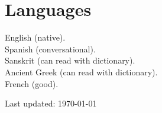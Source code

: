 \documentclass[11pt, letterpaper]{article} %
\newcommand{\years}[1]{\marginnote{\scriptsize #1}} %
\begin{document}


\section*{Languages}
\years{}English (native).\\
\years{}Spanish (conversational).\\
\years{}Sanskrit (can read with dictionary).\\
\years{}Ancient Greek (can read with dictionary).\\
\years{}French (good).






\vfill{} %


\begin{center}
{\scriptsize Last updated: \today }
\end{center}

\end{document}
